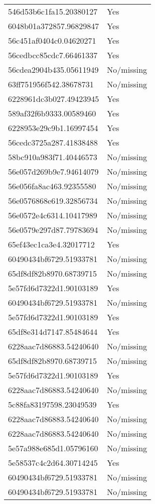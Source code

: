 \begin{tabular}{ll}
546d53b6c1fa15.20380127 & Yes \\
6048b01a372857.96829847 & Yes \\
56c451af0404c0.04620271 & Yes \\
56cedbcc85cdc7.66461337 & Yes \\
56cdea2904b435.05611949 & No/missing \\
63ff751956f542.38678731 & No/missing \\
6228961dc3b027.49423945 & Yes \\
589af32f6b9333.00589460 & Yes \\
6228953e29c9b1.16997454 & Yes \\
56cedc3725a287.41838488 & Yes \\
58bc910a983f71.40446573 & No/missing \\
56e057d269b9e7.94614079 & No/missing \\
56e056fa8ac463.92355580 & No/missing \\
56e0576868e619.32856734 & No/missing \\
56e0572e4c6314.10417989 & No/missing \\
56e0579e297d87.79783694 & No/missing \\
65ef43ec1ca3e4.32017712 & Yes \\
60490434bf6729.51933781 & No/missing \\
65df8df82b8970.68739715 & No/missing \\
5e57fd6d7322d1.90103189 & Yes \\
60490434bf6729.51933781 & No/missing \\
5e57fd6d7322d1.90103189 & Yes \\
65df8e314d7147.85484644 & Yes \\
6228aac7d86883.54240640 & No/missing \\
65df8df82b8970.68739715 & No/missing \\
5e57fd6d7322d1.90103189 & Yes \\
6228aac7d86883.54240640 & No/missing \\
5c88fa83197598.23049539 & Yes \\
6228aac7d86883.54240640 & No/missing \\
6228aac7d86883.54240640 & No/missing \\
5e57a988e685d1.05796160 & No/missing \\
5e58537c4c2d64.30714245 & Yes \\
60490434bf6729.51933781 & No/missing \\
60490434bf6729.51933781 & No/missing \\

\end{tabular}
